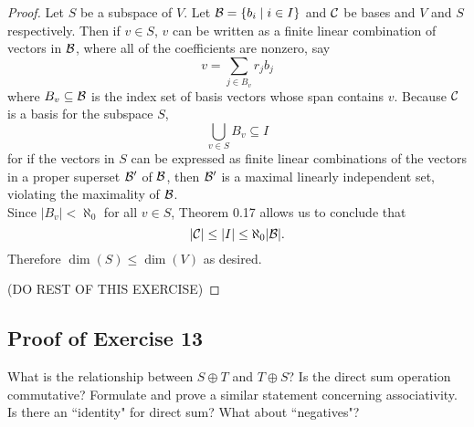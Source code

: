 \begin{proof}
Let $S$ be a subspace of $V$. Let ${\mathcal{B}} = \{b_i\mid i\in I\}$ and ${\mathcal{C}}$ be bases and $V$ and $S$ respectively. Then if $v\in S$, $v$ can be written as a finite linear combination of vectors in ${\mathcal{B}}$, where all of the coefficients are nonzero, say
\[
	v = \sum_{j\in B_v} r_jb_j
\]
where $B_v\subseteq{\mathcal{B}}$ is the index set of basis vectors whose span contains $v$. Because ${\mathcal{C}}$ is a basis for the subspace $S$,
\[
	\bigcup_{v\in S} B_v\subseteq I
\]
for if the vectors in $S$ can be expressed as finite linear combinations of the vectors in a proper superset ${\mathcal{B}}'$ of ${\mathcal{B}}$, then ${\mathcal{B}}'$ is a maximal linearly independent set, violating the maximality of ${\mathcal{B}}$.\\
 
Since $|B_v|<\aleph_0$ for all $v\in S$, Theorem 0.17 allows us to conclude that
\[
	|{\mathcal{C}}| \leq |I| \leq \aleph_0|{\mathcal{B}}|. 
\]
Therefore $\dim(S)\leq \dim(V)$ as desired.

(DO REST OF THIS EXERCISE)

\end{proof}

\vfill
\pagebreak

\subsection{Proof of Exercise 13}
What is the relationship between $S\oplus T$ and $T\oplus S$? Is the direct sum operation commutative? Formulate and prove a similar statement concerning associativity. Is there an ``identity" for direct sum? What about ``negatives"?

